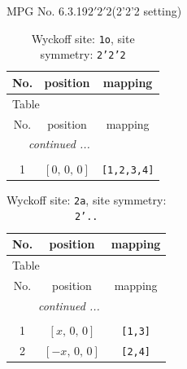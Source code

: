 \documentclass[fleqn,8pt]{jsarticle}
\begin{document}
\setcounter{MaxMatrixCols}{32}

\renewcommand{\tablename}{Table~}
\renewcommand{\figurename}{Figure~}
\begin{center}
\LARGE
MPG No. 6.3.19\quad$2'2'2$\quad(2'2'2 setting)
\end{center}
\renewcommand{\arraystretch}{1.2}
\begin{longtable}{ccc}
\caption{Wyckoff site: {\tt 1o}, site symmetry: {\tt 2'2'2}}
 \\
 \hline \hline
No. & position & mapping \\ \hline \endfirsthead

\multicolumn{2}{l}{\tablename\ \thetable{}} \\
 \hline \hline
No. & position & mapping \\ \hline \endhead

 \hline \hline
\multicolumn{2}{r}{\footnotesize\it continued ...} \\ \endfoot

 \hline \hline
\multicolumn{2}{r}{} \\ \endlastfoot

1 & $\left[ 0,\, 0,\, 0 \right]$ & {\tt [1,2,3,4]} \\
\end{longtable}
\renewcommand{\arraystretch}{1.2}
\begin{longtable}{ccc}
\caption{Wyckoff site: {\tt 2a}, site symmetry: {\tt 2'..}}
 \\
 \hline \hline
No. & position & mapping \\ \hline \endfirsthead

\multicolumn{2}{l}{\tablename\ \thetable{}} \\
 \hline \hline
No. & position & mapping \\ \hline \endhead

 \hline \hline
\multicolumn{2}{r}{\footnotesize\it continued ...} \\ \endfoot

 \hline \hline
\multicolumn{2}{r}{} \\ \endlastfoot

1 & $\left[ x,\, 0,\, 0 \right]$ & {\tt [1,3]} \\ \hline
2 & $\left[ - x,\, 0,\, 0 \right]$ & {\tt [2,4]} \\
\end{longtable}
\renewcommand{\arraystretch}{1.2}
\end{document}
